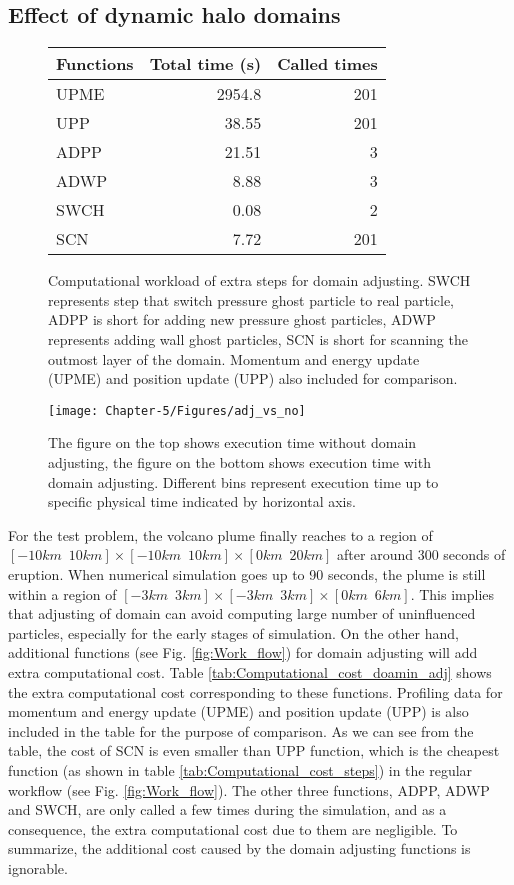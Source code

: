\subsection{Effect of dynamic halo domains} \label{sec:effect-of-halo-domain}
\begin{figure}
\centering
{	  
    \begin{tabular}{lrr}
    \hline
    Functions & Total time (s) & Called times\\
    	\hline
    UPME & 2954.8 & 201 \\
    UPP & 38.55 &  201 \\
    ADPP & 21.51 & 3 \\
    ADWP  & 8.88 & 3 \\
    SWCH & 0.08 &  2 \\
    SCN  & 7.72 & 201 \\
    \hline
  \end{tabular}
}
{\caption{Computational workload of extra steps for domain adjusting. SWCH represents step that switch pressure ghost particle to real particle, ADPP is short for adding new pressure ghost particles, ADWP represents adding wall ghost particles, SCN is short for scanning the outmost layer of the domain.  Momentum and energy update (UPME) and position update (UPP) also included for comparison.}
\label{tab:Computational_cost_doamin_adj}}
\centering
{\texttt{[image: Chapter-5/Figures/adj\_vs\_no]}}
{\caption{The figure on the top shows execution time without domain adjusting, the figure on the bottom shows execution time with domain adjusting. Different bins represent execution time up to specific physical time indicated by horizontal axis.}
\label{fig:adj_vs_no}}
\end{figure}
For the test problem, the volcano plume finally reaches to a region of $[-10km \,\,\, 10km] \times [-10km\,\,\,10km] \times [0km\,\,\,20km]$ after around 300 seconds of eruption. When numerical simulation goes up to 90 seconds, the plume is still within a region of $[-3km\,\,\,3km] \times [-3km\,\,\,3km] \times [0km\,\,\,6km]$. This implies that adjusting of domain can avoid computing large number of uninfluenced particles, especially for the early stages of simulation. On the other hand, additional functions (see Fig. \ref{fig:Work_flow}) for domain adjusting will add extra computational cost. Table \ref{tab:Computational_cost_doamin_adj} shows the extra computational cost corresponding to these functions. Profiling data for momentum and energy update (UPME) and position update (UPP) is also included in the table for the purpose of comparison. As we can see from the table, the cost of SCN is even smaller than UPP function, which is the cheapest function (as shown in table \ref{tab:Computational_cost_steps}) in the regular workflow (see Fig. \ref{fig:Work_flow}). The other three functions, ADPP, ADWP and SWCH, are only called a few times during the simulation, and as a consequence, the extra computational cost due to them are negligible. To summarize, the additional cost caused by the domain adjusting functions is ignorable.
